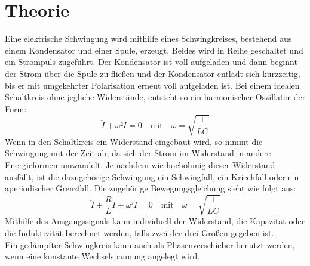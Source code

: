 \section{Theorie}
\label{sec:Theorie}

Eine elektrische Schwingung wird mithilfe eines Schwingkreises, bestehend aus einem Kondensator und einer Spule, erzeugt.
Beides wird in Reihe geschaltet und ein Strompuls zugeführt.
Der Kondensator ist voll aufgeladen und dann beginnt der Strom über die Spule zu fließen und der Kondensator entlädt sich kurzzeitig, bis er mit umgekehrter Polarisation erneut voll aufgeladen ist.
Bei einem idealen Schaltkreis ohne jegliche Widerstände, entsteht so ein harmonischer Oszillator der Form:
\begin{equation}
    \ddot{I} + \omega² I = 0 \quad\textrm{mit}\quad \omega = \sqrt{\frac{1}{LC}}
\end{equation}
Wenn in den Schaltkreis ein Widerstand eingebaut wird, so nimmt die Schwingung mit der Zeit ab, da sich der Strom im Widerstand in andere Energieformen umwandelt.
Je nachdem wie hochohmig dieser Widerstand ausfällt, ist die dazugehörige Schwingung ein Schwingfall, ein Kriechfall oder ein aperiodischer Grenzfall.
Die zugehörige Bewegungsgleichung sieht wie folgt aus:
\begin{equation}
    \ddot{I} + \frac{R}{L}\dot{I} + \omega² I = 0 \quad\textrm{mit}\quad \omega = \sqrt{\frac{1}{LC}}
\end{equation}
Mithilfe des Ausgangssignals kann individuell der Widerstand, die Kapazität oder die Induktivität berechnet werden, falls zwei der drei Größen gegeben ist.
\\
Ein gedämpfter Schwingkreis kann auch als Phasenverschieber benutzt werden, wenn eine konstante Wechselspannung angelegt wird.